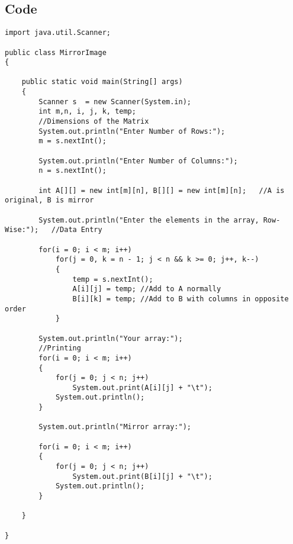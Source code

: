 \documentclass[ProgramminAssignment.tex]{subfiles}
\begin{document}
\subsection{Code}
\begin{lstlisting}
import java.util.Scanner;

public class MirrorImage
{

	public static void main(String[] args)
	{
		Scanner s  = new Scanner(System.in);
		int m,n, i, j, k, temp;
		//Dimensions of the Matrix
		System.out.println("Enter Number of Rows:");
		m = s.nextInt();
		
		System.out.println("Enter Number of Columns:");
		n = s.nextInt();
		
		int A[][] = new int[m][n], B[][] = new int[m][n];	//A is original, B is mirror
		
		System.out.println("Enter the elements in the array, Row-Wise:");	//Data Entry
		
		for(i = 0; i < m; i++)
			for(j = 0, k = n - 1; j < n && k >= 0; j++, k--)
			{
				temp = s.nextInt();
				A[i][j] = temp;	//Add to A normally
				B[i][k] = temp;	//Add to B with columns in opposite order
			}
		
		System.out.println("Your array:");
		//Printing
		for(i = 0; i < m; i++)
		{
			for(j = 0; j < n; j++)
				System.out.print(A[i][j] + "\t");
			System.out.println();
		}
		
		System.out.println("Mirror array:");
		
		for(i = 0; i < m; i++)
		{
			for(j = 0; j < n; j++)
				System.out.print(B[i][j] + "\t");
			System.out.println();
		}
		
	}

}

\end{lstlisting}
\end{document}
